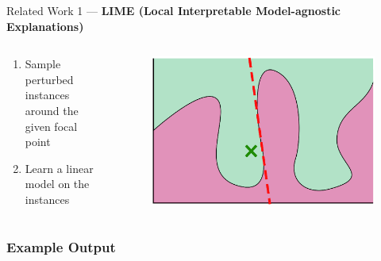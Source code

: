 \documentclass[aspectratio=169]{slide-en}
\begin{document}
\begin{frame}{}
  Related Work 1 — \textbf{LIME
    \small{(Local Interpretable Model-agnostic Explanations)}}
  \begin{columns}[]
    \begin{column}{0.5\textwidth}
      \begin{enumerate}
        \item Sample perturbed instances around the given focal point
        \item Learn a linear model on the instances
      \end{enumerate}
    \end{column}
    \begin{column}{0.5\textwidth}
      \begin{figure}
        \includegraphics[scale=0.35]{img/visual-lime}
      \end{figure}
    \end{column}
  \end{columns}
\end{frame}

\subsubsection{Example Output}
\end{document}

